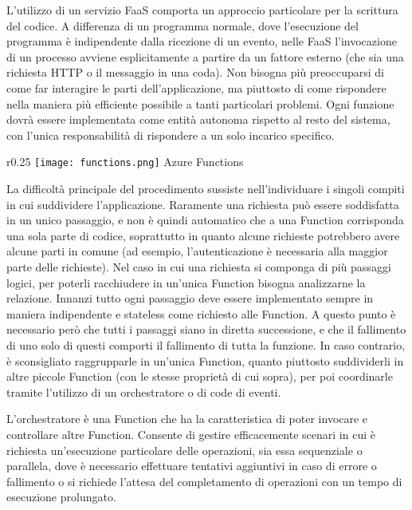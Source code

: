 L'utilizzo di un servizio FaaS comporta un approccio particolare per la scrittura del codice.
A differenza di un programma normale,
dove l'esecuzione del programma è indipendente dalla ricezione di un evento,
nelle FaaS l'invocazione di un processo avviene esplicitamente a partire da un fattore esterno
(che sia una richiesta HTTP o il messaggio in una coda).
Non bisogna più preoccuparsi di come far interagire le parti dell'applicazione,
ma piuttosto di come rispondere nella maniera più efficiente possibile a tanti particolari problemi.
Ogni funzione dovrà essere implementata come entità autonoma rispetto al resto del sistema,
con l'unica responsabilità di rispondere a un solo incarico specifico.\\
\begin{wrapfigure}{r}{0.25\textwidth}
    \centering
    \texttt{[image: functions.png]}
    Azure Functions
\end{wrapfigure}
La difficoltà principale del procedimento sussiste nell'individuare i singoli compiti
in cui suddividere l'applicazione.
Raramente una richiesta può essere soddisfatta in un unico passaggio,
e non è quindi automatico che a una Function corrisponda una sola parte di codice,
soprattutto in quanto alcune richieste potrebbero avere alcune parti in comune
(ad esempio, l'autenticazione è necessaria alla maggior parte delle richieste).
Nel caso in cui una richiesta si componga di più passaggi logici,
per poterli racchiudere in un'unica Function bisogna analizzarne la relazione.
Innanzi tutto ogni passaggio deve essere implementato sempre in maniera indipendente e stateless
come richiesto alle Function.
A questo punto è necessario però che tutti i passaggi siano in diretta successione,
e che il fallimento di uno solo di questi comporti il fallimento di tutta la funzione.
In caso contrario, è sconsigliato raggrupparle in un'unica Function,
quanto piuttosto suddividerli in altre piccole Function (con le stesse proprietà di cui sopra),
per poi coordinarle tramite l'utilizzo di un orchestratore o di code di eventi.\\
\par
L'orchestratore è una Function che ha la caratteristica
di poter invocare e controllare altre Function.
Consente di gestire efficacemente scenari
in cui è richiesta un'esecuzione particolare delle operazioni, sia essa sequenziale o parallela,
dove è necessario effettuare tentativi aggiuntivi in caso di errore o fallimento o
si richiede l'attesa del completamento di operazioni con un tempo di esecuzione prolungato.
